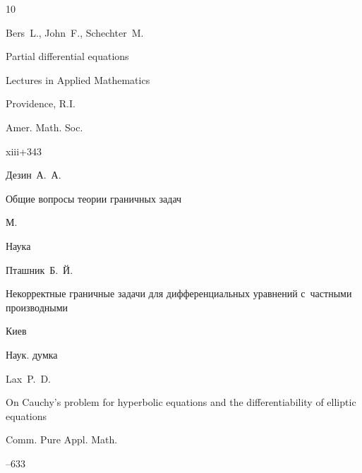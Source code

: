 \begin{thebibliography}{10}




\by Bers~L., John~F.,  Schechter~M.

\book Partial differential equations


\serial Lectures in Applied Mathematics

\publaddr  Providence, R.I.

\publ Amer. Math. Soc.

\totalpages xiii+343 







\by Дезин~А.~А.

\book Общие вопросы теории граничных задач

\publaddr М.

\publ Наука









\by Пташник~Б.~Й. 

\book Некорректные граничные задачи для дифференциальных уравнений с~частными производными

\publaddr Киев

\publ Наук. думка






\by Lax~P.~D.

\paper  On Cauchy's problem for hyperbolic equations and the differentiability of elliptic equations


\jour Comm. Pure Appl. Math.




--633 





\end{thebibliography}

